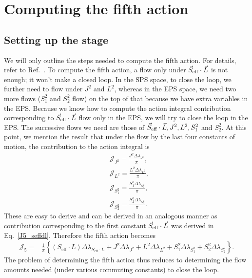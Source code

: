 \section{Computing the fifth action}


\subsection{Setting up the stage}


We will only outline the steps needed to compute the fifth action. For details,
refer to Ref.~\cite{tanay2021action}. To compute the fifth action,
a flow only under $\vec{S}_{\text{eff}}\cdot \vec{L}$ is not enough; it won't make a closed loop.
In the SPS space, to close the loop, we further need to flow under
$J^2$ and $L^2$, whereas in the EPS space, we need two more flows 
($S_1^2$ and $S_2^2$ flow) on the
top of that because we have extra variables in the EPS. Because we know
how to compute the action integral  contribution corresponding
to $\vec{S}_{\text{eff}}\cdot \vec{L}$ flow only in the EPS, we will try to close the loop in the EPS.
The successive flows we need are those of $\vec{S}_{\text{eff}}\cdot \vec{L}, J^2, L^2, S_1^2$ and $S_2^2$.
At this point, we mention the result that under the flow by 
the last four 
constants of motion, the contribution to the action integral is 
\begin{equation}
\begin{aligned}
&\mathcal{J}_{J^{2}}=\frac{J^{2} \Delta \lambda_{J^{2}}}{\pi} , \\
&\mathcal{J}_{L^{2}}=\frac{L^{2} \Delta \lambda_{L^{2}}}{\pi}, \\
&\mathcal{J}_{S_{1}^{2}}=\frac{S_{1}^{2} \Delta \lambda_{S_{1}^{2}}}{\pi}, \\
&\mathcal{J}_{S_{2}^{2}}=\frac{S_{2}^{2} \Delta \lambda_{S_{2}^{2}}}{\pi}.
\end{aligned}
\end{equation}
These are easy to derive and can be derived in an
analogous manner as contribution corresponding to the first
constant $\vec{S}_{\text{eff}}\cdot \vec{L}$ was derived in Eq.~\eqref{J5_seffdl}. Therefore the 
fifth action becomes
\begin{equation}     \label{J5_final}
\begin{aligned}
\mathcal{J}_{5}=& \frac{1}{\pi}\left\{\left(S_{\mathrm{eff}} \cdot L\right) \Delta \lambda_{S_{\mathrm{eff}} \cdot L}+J^{2} \Delta \lambda_{J^{2}}+L^{2} \Delta \lambda_{L^{2}}
+S_{1}^{2} \Delta \lambda_{S_{1}^{2}}+S_{2}^{2} \Delta \lambda_{S_{2}^{2}}\right\} .
\end{aligned}
\end{equation}
The problem of determining the fifth action thus reduces to determining 
the flow amounts needed (under various commuting constants) to close the loop.





